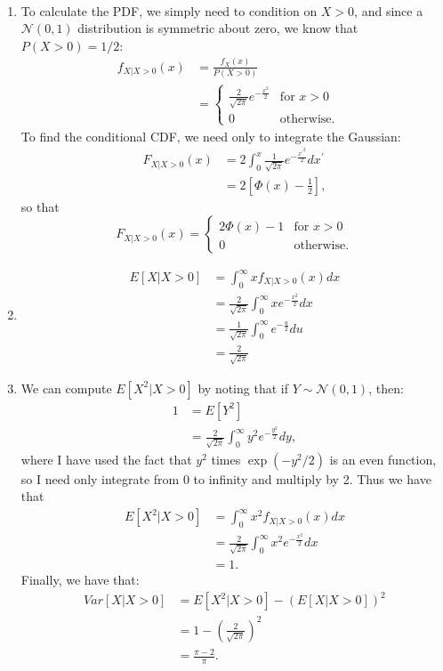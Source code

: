 \begin{problem}{20} $ $
\begin{enumerate}
\item
To calculate the PDF, we simply need to condition on $X>0$, and since a $\mathcal N(0, 1)$ distribution is symmetric about zero, we know that $P(X>0) =1/2$:
\begin{align*}  
f_{X|X>0}(x) &=\frac{f_X(x)}{P(X>0)} \\
& = \begin{cases}
                                   \frac{2}{\sqrt{2 \pi}} e^{-\frac{x^2}{2}} & \text{for $x >0$} \\
                                   0 & \text{otherwise}.
       \end{cases} \quad
       \end{align*}
To find the conditional CDF, we need only to integrate the Gaussian:
\begin{align*}
F_{X|X>0}(x) &= 2 \int_0^x \frac{1}{\sqrt{2 \pi}}e^{-\frac{{x^\prime}^2}{2}}dx^\prime \\
& =2\left[ \Phi(x) -\frac{1}{2} \right],
\end{align*}
so that
\[
 F_{X|X>0}(x) =
  \begin{cases}
                                   2\Phi(x) -1 & \text{for $x>0$} \\
                                   0& \text{otherwise}.
   \end{cases}
\]

\item
\begin{align*}
E[X|X>0] &= \int_0^\infty x f_{X|X>0}(x)dx \\
& = \frac{2}{\sqrt{2 \pi}} \int_0^\infty x e^{-\frac{x^2}{2}}dx \\
& = \frac{1}{\sqrt{2 \pi}} \int_0^\infty e^{-\frac{u}{2}}du \\
& = \frac{2}{\sqrt{2 \pi}}
\end{align*}


\item We can compute $E[X^2|X>0]$ by noting that if $Y \sim \mathcal N(0, 1)$, then:
\begin{align*}
1 &= E[Y^2] \\
& =\frac{2}{\sqrt{2 \pi} } \int_0^\infty y^2 e^{-\frac{y^2}{2}}dy,
\end{align*}
where I have used the fact that $y^2$ times $\exp{(-y^2/2)}$ is an even function, so I need only integrate from 0 to infinity and multiply by 2.  Thus we have that 
\begin{align*}
E[X^2|X>0] &= \int_0^\infty x^2 f_{X|X>0}(x)dx \\
& = \frac{2}{\sqrt{2 \pi}} \int_0^\infty x^2 e^{-\frac{x^2}{2}}dx \\
& = 1.
\end{align*}
Finally, we have that:
\begin{align*}
Var[X|X>0] &= E[X^2|X>0] -(E[X|X>0] )^2 \\
&=1- \left(\frac{2}{\sqrt{2 \pi}}\right)^2 \\
& =\frac{\pi-2}{\pi}.
\end{align*}


\end{enumerate}
\end{problem}
